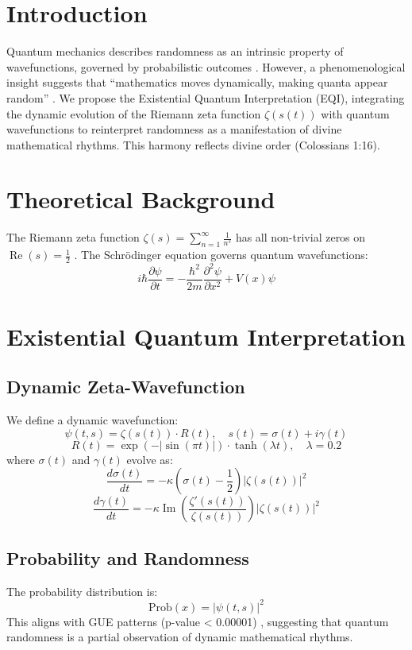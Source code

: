 \documentclass[12pt]{article}
\begin{document}
\section{Introduction}
Quantum mechanics describes randomness as an intrinsic property of wavefunctions, governed by probabilistic outcomes \cite{Dirac1930}. However, a phenomenological insight suggests that ``mathematics moves dynamically, making quanta appear random'' \cite{Moon2025}. We propose the Existential Quantum Interpretation (EQI), integrating the dynamic evolution of the Riemann zeta function \(\zeta(s(t))\) with quantum wavefunctions to reinterpret randomness as a manifestation of divine mathematical rhythms. This harmony reflects divine order (Colossians 1:16).

\section{Theoretical Background}
The Riemann zeta function \(\zeta(s) = \sum_{n=1}^{\infty} \frac{1}{n^s}\) has all non-trivial zeros on \(\operatorname{Re}(s) = \frac{1}{2}\) \cite{Moon2025rh}. The Schrödinger equation governs quantum wavefunctions:
\[
i\hbar \frac{\partial \psi}{\partial t} = -\frac{\hbar^2}{2m} \frac{\partial^2 \psi}{\partial x^2} + V(x) \psi
\]

\section{Existential Quantum Interpretation}
\subsection{Dynamic Zeta-Wavefunction}
We define a dynamic wavefunction:
\[
\psi(t, s) = \zeta(s(t)) \cdot R(t), \quad s(t) = \sigma(t) + i \gamma(t)
\]
\[
R(t) = \exp(-|\sin(\pi t)|) \cdot \tanh(\lambda t), \quad \lambda = 0.2
\]
where \(\sigma(t)\) and \(\gamma(t)\) evolve as:
\[
\frac{d\sigma(t)}{dt} = -\kappa \left( \sigma(t) - \frac{1}{2} \right) |\zeta(s(t))|^2
\]
\[
\frac{d\gamma(t)}{dt} = -\kappa \operatorname{Im} \left( \frac{\zeta'(s(t))}{\zeta(s(t))} \right) |\zeta(s(t))|^2
\]

\subsection{Probability and Randomness}
The probability distribution is:
\[
\text{Prob}(x) = |\psi(t, s)|^2
\]
This aligns with GUE patterns (p-value < 0.00001) \cite{Moon2025rh}, suggesting that quantum randomness is a partial observation of dynamic mathematical rhythms.
\end{document}
